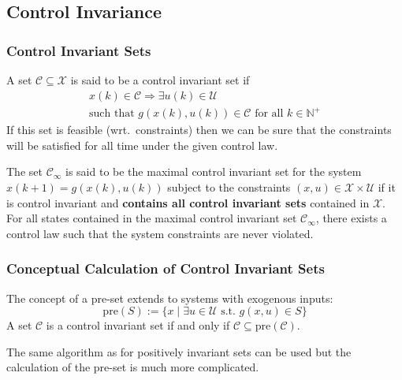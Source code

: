 \subsection{Control Invariance}
\subsubsection{Control Invariant Sets}
A set $\mathcal{C} \subseteq \mathcal{X}$ is said to be a control invariant set if
\begin{gather*}
    x(k) \in \mathcal{C} \Rightarrow \exists u(k) \in \mathcal{U}\\
    \text{such that } g(x(k), u(k)) \in \mathcal{C} \text{ for all } k \in \mathbb{N}^+
\end{gather*}
If this set is feasible (wrt.\ constraints) then we can be sure that the constraints will be satisfied for all time under the given control law.

\newpar{}

The set $\mathcal{C}_\infty$ is said to be the maximal control invariant set for the system $x(k + 1) = g(x(k), u(k))$ subject to the constraints $(x, u) \in \mathcal{X} \times \mathcal{U}$ if it is control invariant and \textbf{contains all control invariant sets} contained in $\mathcal{X}$.
\newpar{}
For all states contained in the maximal control invariant set $\mathcal{C}_\infty$, there exists a control law such that the system constraints are never violated.

\subsubsection{Conceptual Calculation of Control Invariant Sets}

The concept of a pre-set extends to systems with exogenous inputs:
\begin{equation*}
    \text{pre}(S) := \{x \mid \exists u \in \mathcal{U} \text{ s.t. } g(x, u) \in S \}
\end{equation*}
A set $\mathcal{C}$ is a control invariant set if and only if $\mathcal{C} \subseteq \text{pre}(\mathcal{C})$.

\newpar{}
The same algorithm as for positively invariant sets can be used but the calculation of the pre-set is much more complicated.



